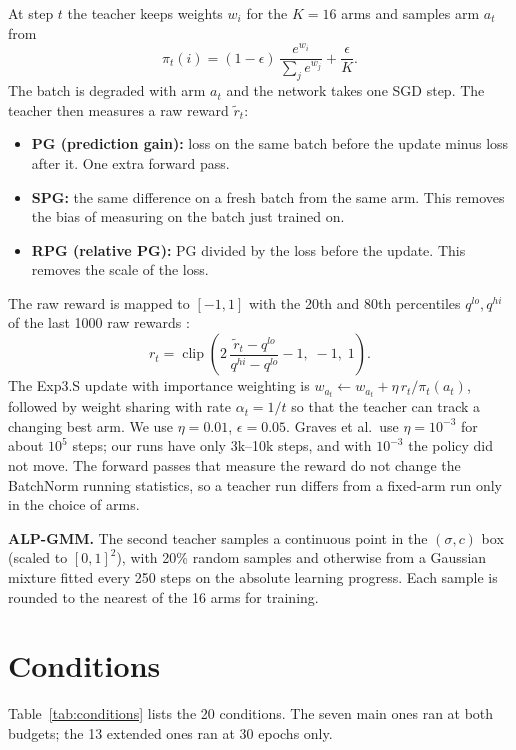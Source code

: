 \documentclass[a4paper,12pt]{report}
\begin{document}
At step $t$ the teacher keeps weights $w_i$ for the $K=16$ arms and samples arm $a_t$ from
\begin{equation}
\pi_t(i) = (1-\epsilon)\,\frac{e^{w_i}}{\sum_j e^{w_j}} + \frac{\epsilon}{K}.
\end{equation}
The batch is degraded with arm $a_t$ and the network takes one SGD step. The teacher then measures a raw reward $\tilde r_t$:
\begin{itemize}
\item \textbf{PG (prediction gain):} loss on the same batch before the update minus loss after it. One extra forward pass.
\item \textbf{SPG:} the same difference on a fresh batch from the same arm. This removes the bias of measuring on the batch just trained on.
\item \textbf{RPG (relative PG):} PG divided by the loss before the update. This removes the scale of the loss.
\end{itemize}
The raw reward is mapped to $[-1,1]$ with the 20th and 80th percentiles $q^{lo}, q^{hi}$ of the last 1000 raw rewards \cite{graves2017}:
\begin{equation}
r_t = \operatorname{clip}\!\left(2\,\frac{\tilde r_t - q^{lo}}{q^{hi}-q^{lo}} - 1,\; -1,\; 1\right).
\end{equation}
The Exp3.S update with importance weighting is $w_{a_t} \leftarrow w_{a_t} + \eta\, r_t / \pi_t(a_t)$, followed by weight sharing with rate $\alpha_t = 1/t$ so that the teacher can track a changing best arm. We use $\eta=0.01$, $\epsilon=0.05$. Graves et al.\ use $\eta=10^{-3}$ for about $10^5$ steps; our runs have only 3k--10k steps, and with $10^{-3}$ the policy did not move. The forward passes that measure the reward do not change the BatchNorm running statistics, so a teacher run differs from a fixed-arm run only in the choice of arms.

\textbf{ALP-GMM.} The second teacher samples a continuous point in the $(\sigma, c)$ box (scaled to $[0,1]^2$), with 20\% random samples and otherwise from a Gaussian mixture fitted every 250 steps on the absolute learning progress. Each sample is rounded to the nearest of the 16 arms for training.

\section{Conditions}

Table~\ref{tab:conditions} lists the 20 conditions. The seven main ones ran at both budgets; the 13 extended ones ran at 30 epochs only.
\end{document}
